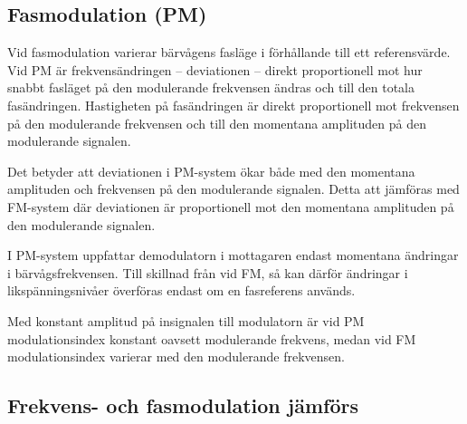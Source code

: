 \subsection{Fasmodulation (PM)}

Vid fasmodulation varierar bärvågens fasläge i förhållande till ett
referensvärde.
Vid PM är frekvensändringen -- deviationen -- direkt proportionell mot hur
snabbt fasläget på den modulerande frekvensen ändras och till den totala
fasändringen.
Hastigheten på fasändringen är direkt proportionell mot frekvensen på den
modulerande frekvensen och till den momentana amplituden på den modulerande
signalen.

Det betyder att deviationen i PM-system ökar både med den momentana amplituden
och frekvensen på den modulerande signalen.
Detta att jämföras med FM-system där deviationen är proportionell mot den
momentana amplituden på den modulerande signalen.

I PM-system uppfattar demodulatorn i mottagaren endast momentana ändringar i
bärvågsfrekvensen.
Till skillnad från vid FM, så kan därför ändringar i likspänningsnivåer
överföras endast om en fasreferens används.

Med konstant amplitud på insignalen till modulatorn är vid PM
modulationsindex konstant oavsett modulerande frekvens, medan vid FM
modulationsindex varierar med den modulerande frekvensen.

\subsection{Frekvens- och fasmodulation jämförs}

